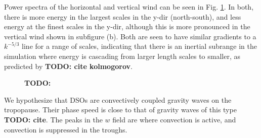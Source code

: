 \documentclass[11pt,a4paper]{article}
\newcommand\todo[1]{\textbf{TODO: #1}}
\begin{document}
Power spectra of the horizontal and vertical wind can be seen in Fig. \ref{fig:power_spectra}. In both, there is more energy in the largest scales in the y-dir (north-south), and less energy at the finest scales in the y-dir, although this is more pronounced in the vertical wind shown in subfigure (b). Both are seen to have similar gradients to a $k^{-5/3}$ line for a range of scales, indicating that there is an inertial subrange in the simulation where energy is cascading from larger length scales to smaller, as predicted by \todo{cite kolmogorov}.

\begin{figure}[htb!]%
    \centering
    \qquad
    \caption{\todo{}}%
    \label{fig:power_spectra}%
\end{figure}


We hypothesize that DSOs are convectively coupled gravity waves on the tropopause. Their phase speed is close to that of gravity waves of this type \todo{cite}. The peaks in the $w$ field are where convection is active, and convection is suppressed in the troughs. 
\end{document}

